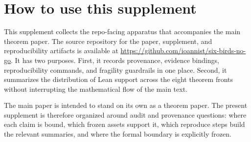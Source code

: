 \section*{How to use this supplement}
This supplement collects the repo-facing apparatus that accompanies the main theorem paper.
The source repository for the paper, supplement, and reproducibility artifacts is available at \url{https://github.com/ioannist/six-birds-no-go}.
It has two purposes.
First, it records provenance, evidence bindings, reproducibility commands, and fragility guardrails in one place.
Second, it summarizes the distribution of Lean support across the eight theorem fronts without interrupting the mathematical flow of the main text.

The main paper is intended to stand on its own as a theorem paper.
The present supplement is therefore organized around audit and provenance questions: where each claim is bound, which frozen assets support it, which reproduce steps build the relevant summaries, and where the formal boundary is explicitly frozen.
